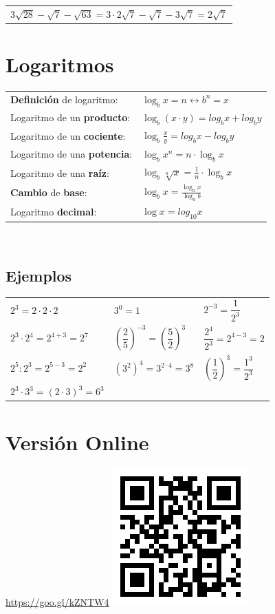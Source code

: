 \documentclass[a4paper,spanish,9pt]{extarticle}
\begin{document}
\begin{multicols*}{2}
\begin{tabular}{l}
$3\sqrt{28}-\sqrt{7}-\sqrt{63}=3\cdot 2\sqrt{7}-\sqrt{7}-3\sqrt{7}=2\sqrt{7}$ 
\end{tabular}

\section{Logaritmos}

\begin{tabular}{ll}
\textbf{Definición} de logaritmo: & $\log_b x = n \longleftrightarrow b^n=x$\\
Logaritmo de un \textbf{producto}: & $\log_b \left(x\cdot y\right)=log_b x + log_b y$\\
Logaritmo de un \textbf{cociente}: & $\log_b \frac{x}{y}=log_b x - log_b y$\\
Logaritmo de una \textbf{potencia}: & $\log_b {x^n} = n \cdot \log_b x$\\
Logaritmo de una \textbf{raíz}: & $\log_b {\sqrt[n]{x}} = \frac{1}{n} \cdot \log_b x$\\
\textbf{Cambio} de \textbf{base}: & $\log_b x =\frac{\log_a x}{\log_a b}$\\
Logaritmo \textbf{decimal}: & $\log x = log_{10} x$
\end{tabular}\\

\subsection{Ejemplos}

\begin{tabular}{lll}
$2^3=2\cdot2\cdot2$ & $3^0=1$ & $2^{-3}=\dfrac{1}{2^3}$\\
$2^3 \cdot 2^4 = 2^{4+3} = 2^{7}$ & $\left(\dfrac{2}{5}\right)^{-3}=\left(\dfrac{5}{2}\right)^{3}$ & $\dfrac{2^4}{2^3} = 2^{4-3} = 2$\\
$2^5:2^3 = 2^{5-3} = 2^2$ & $\left(3^2\right)^4  = 3^{2 \cdot 4}=3^{8}$ & $\left(\dfrac{1}{2} \right)^3 = \dfrac{1^3}{2^3}$\\
$2^3 \cdot 3^3=\left(2 \cdot 3 \right)^3 = 6^3$
\end{tabular}


\section{Versión Online}

\url{https://goo.gl/kZNTW4} \includegraphics[width=0.15\columnwidth]{qr_chuletapot}





\end{multicols*}
\end{document}
